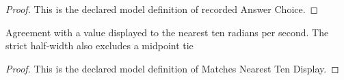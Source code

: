 \begin{proof}
  This is the declared model definition of recorded Answer Choice.
\end{proof}
\begin{definition}
  \label{def:physics:phyx-mini-0289:phyxminiproblems-problemphyxmini0289-matchesnearesttendisplay}
  Agreement with a value displayed to the nearest ten radians per second. The strict half-width also excludes a midpoint tie
\end{definition}
\begin{proof}
  This is the declared model definition of Matches Nearest Ten Display.
\end{proof}
